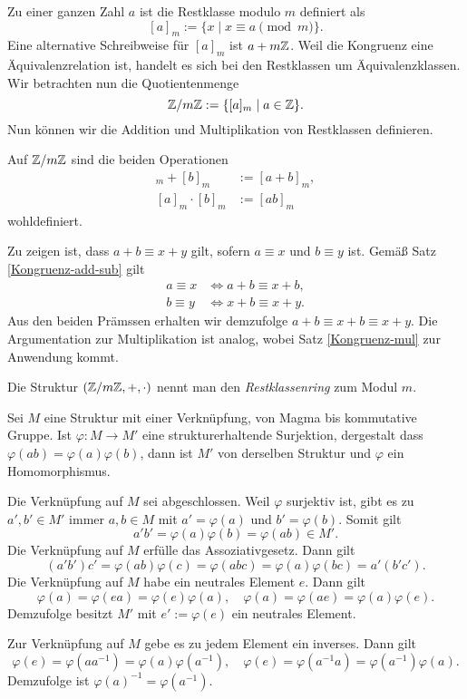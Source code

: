 Zu einer ganzen Zahl $a$ ist die Restklasse modulo $m$ definiert als 
\[[a]_m := \{x\mid x\equiv a\pmod m\}.\]
Eine alternative Schreibweise für $[a]_m$ ist $a+m\mathbb Z$. Weil die
Kongruenz eine Äquivalenzrelation ist, handelt es sich bei den
Restklassen um Äquivalenzklassen. Wir betrachten nun die
Quotientenmenge
\[\mathbb Z/m\mathbb Z := \{[a]_m\mid a\in\mathbb Z\}.\]
Nun können wir die Addition und Multiplikation von Restklassen
definieren.
\begin{Satz}
Auf $\mathbb Z/m\mathbb Z$ sind die beiden Operationen
\begin{align*}
[a]_m + [b]_m &:= [a+b]_m,\\
[a]_m\cdot [b]_m &:= [ab]_m
\end{align*}
wohldefiniert.
\end{Satz}
 Zu zeigen ist, dass $a+b\equiv x+y$ gilt, sofern
$a\equiv x$ und $b\equiv y$ ist. Gemäß Satz \ref{Kongruenz-add-sub} gilt
\begin{align*}
a\equiv x &\iff a+b\equiv x+b,\\
b\equiv y &\iff x+b\equiv x+y.
\end{align*}
Aus den beiden Prämssen erhalten wir demzufolge
$a+b\equiv x+b\equiv x+y$.
Die Argumentation zur Multiplikation ist analog, wobei
Satz \ref{Kongruenz-mul} zur Anwendung kommt.\,\qedsymbol

Die Struktur $(\mathbb Z/m\mathbb Z,+,\cdot)$ nennt man den \emph{Restklassenring}
zum Modul $m$.

\begin{Lemma}\label{Surjektion-strukturerhaltend}
Sei $M$ eine Struktur mit einer Verknüpfung, von
Magma bis kommutative Gruppe. Ist
$\varphi\colon M\to M'$ eine strukturerhaltende Surjektion,
dergestalt dass $\varphi(ab)=\varphi(a)\varphi(b)$, dann ist
$M'$ von derselben Struktur und $\varphi$ ein Homomorphismus.
\end{Lemma}
 Die Verknüpfung auf $M$ sei abgeschlossen. Weil
$\varphi$ surjektiv ist, gibt es zu $a',b'\in M'$ immer
$a,b\in M$ mit $a'=\varphi(a)$ und $b'=\varphi(b)$. Somit gilt
\[a'b' = \varphi(a)\varphi(b) = \varphi(ab)\in M'.\]
Die Verknüpfung auf $M$ erfülle das Assoziativgesetz. Dann gilt
\[(a'b')c' = \varphi(ab)\varphi(c) = \varphi(abc)
= \varphi(a)\varphi(bc) = a'(b'c').\]
Die Verknüpfung auf $M$ habe ein neutrales Element $e$. Dann gilt
\[\varphi(a)=\varphi(ea) = \varphi(e)\varphi(a),\quad
\varphi(a)=\varphi(ae)=\varphi(a)\varphi(e).\]
Demzufolge besitzt $M'$ mit $e':=\varphi(e)$ ein neutrales Element.

Zur Verknüpfung auf $M$ gebe es zu jedem Element ein inverses. Dann gilt
\[\varphi(e) = \varphi(aa^{-1}) = \varphi(a)\varphi(a^{-1}),\quad
\varphi(e) = \varphi(a^{-1}a) = \varphi(a^{-1})\varphi(a).\]
Demzufolge ist $\varphi(a)^{-1}=\varphi(a^{-1})$.

